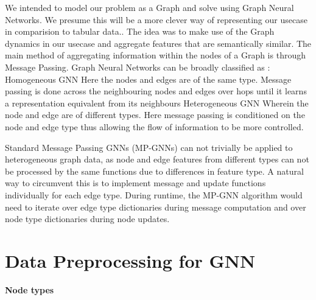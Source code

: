 \documentclass{report} %
\begin{document}
We intended to model our problem as a Graph and solve using Graph Neural Networks. 
We presume this will be a more clever way of representing our usecase in comparision to tabular data..
The idea was to make use of the Graph dynamics in our usecase and aggregate features that are semantically similar.
The main method of aggregating information within the nodes of a Graph is through Message Passing.
Graph Neural Networks can be broadly classified as :
Homogeneous GNN
Here the nodes and edges are of the same type. Message passing is done across the neighbouring nodes and edges over hops until it learns a representation equivalent from its neighbours
Heterogeneous GNN
Wherein the node and edge are of different types. Here message passing is conditioned on the node and edge type thus allowing the flow of information to be more controlled.

Standard Message Passing GNNs (MP-GNNs) can not trivially be applied to heterogeneous graph data, as node and edge features from different types can not be processed by the same functions due to differences in feature type. 
A natural way to circumvent this is to implement message and update functions individually for each edge type. 
During runtime, the MP-GNN algorithm would need to iterate over edge type dictionaries during message computation and over node type dictionaries during node updates.

\section{Data Preprocessing for \ac{GNN}}\label{sec:Data Preprocessing for GNN}


\textbf{Node types}
\end{document}
